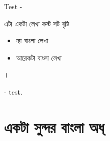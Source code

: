 \documentclass[10pt]{article}
\begin{document}
\tableofcontents
Test - {\bengalifont  এটা একটা লেখা কস্ট সট  বৃষ্টি
\begin{itemize}
    \item হ্যা বাংলা লেখা
    \item আরেকটা বাংলা লেখা 
\end{itemize}।   
} - test.
\section{\bengalifont একটা সুন্দর বাংলা অধ্}
\end{document}
